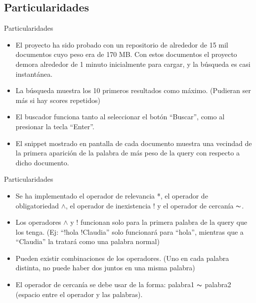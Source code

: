\subsection{Particularidades}
\begin{frame}{Particularidades}

\begin{itemize}

  \item El proyecto ha sido probado con un repositorio de alrededor de 15 mil documentos cuyo peso era de 170 MB.
  Con estos documentos el proyecto demora alrededor de 1 minuto inicialmente para cargar, y la búsqueda es 
  casi instantánea.
  \pause
  \item La búsqueda muestra los 10 primeros resultados como máximo. (Pudieran ser más si hay scores repetidos)
  \pause
  \item El buscador funciona tanto al seleccionar el botón “Buscar”, como al presionar la tecla “Enter”.
  \pause
  \item El snippet mostrado en pantalla de cada documento muestra una vecindad de la primera aparición de la
  palabra de más peso de la query con respecto a dicho documento.

\end{itemize}

\end{frame}

\begin{frame}{Particularidades}
  
\begin{itemize}
  
  \item Se ha implementado el operador de relevancia {*}, el operador de obligatoriedad {$\wedge$}, 
  el operador de inexistencia {!} y el operador de cercanía {$\thicksim$}. 
  \pause
  \item Los operadores {$\wedge$} y {!} funcionan solo para la primera palabra de la query que los 
  tenga. (Ej: “!hola !Claudia” solo funcionará para “hola”, mientras que a “Claudia” la tratará 
  como una palabra normal)
  \pause
  \item Pueden existir combinaciones de los operadores. (Uno en cada palabra distinta, no puede
  haber dos juntos en una misma palabra)
  \pause
  \item El operador de cercanía se debe usar de la forma: palabra1 {$\thicksim$} palabra2 (espacio entre 
  el operador y las palabras).

\end{itemize}

\end{frame}


